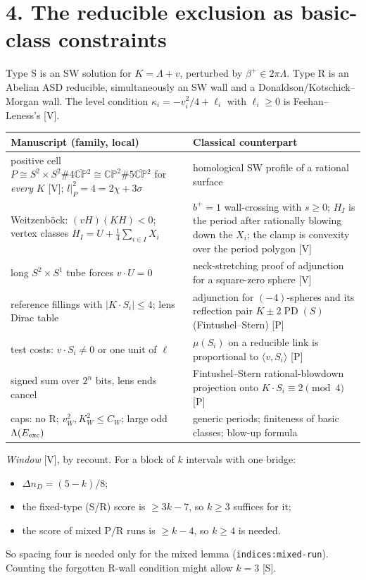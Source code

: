 \documentclass[10pt]{amsart}
\newcommand{\CP}{\mathbb{CP}}\newcommand{\CPb}{\overline{\mathbb{CP}}{}^2}
\newcommand{\PD}{\operatorname{PD}}\newcommand{\CS}{\operatorname{CS}}
\newcommand{\V}{\textsf{[V]}}\newcommand{\Pl}{\textsf{[P]}}\newcommand{\Sp}{\textsf{[S]}}
\begin{document}
\section*{4. The reducible exclusion as basic-class constraints}
Type S is an SW solution for $K=\Lambda+v$, perturbed by $\beta^+\in2\pi\Lambda$. Type R is an Abelian ASD reducible, simultaneously an SW wall and a Donaldson/Kotschick--Morgan wall. The level condition $\kappa_i=-v_i^2/4+\ell_i$ with $\ell_i\ge0$ is Feehan--Leness's \V.
\begin{center}\small
\begin{tabular}{@{}p{}p{}@{}}
\toprule
Manuscript (family, local) & Classical counterpart \\ \midrule
positive cell $P\cong S^2\times S^2\#4\CPb\cong\CP^2\#5\CPb$ for \emph{every} $K$ \V; $l|_P^2=4=2\chi+3\sigma$ & homological SW profile of a rational surface \\
Weitzenb\"ock: $(vH)(KH)<0$; vertex classes $H_I=U+\tfrac14\sum_{i\in I}X_i$ & $b^+=1$ wall-crossing with $s\ge0$; $H_I$ is the period after rationally blowing down the $X_i$; the clamp is convexity over the period polygon \V \\
long $S^2\times S^1$ tube forces $v\cdot U=0$ & neck-stretching proof of adjunction for a square-zero sphere \V \\
reference fillings with $|K\cdot S_i|\le4$; lens Dirac table & adjunction for $(-4)$-spheres and its reflection pair $K\pm2\PD(S)$ (Fintushel--Stern) \Pl \\
test costs: $v\cdot S_i\ne0$ or one unit of $\ell$ & $\mu(S_i)$ on a reducible link is proportional to $\langle v,S_i\rangle$ \Pl \\
signed sum over $2^n$ bits, lens ends cancel & Fintushel--Stern rational-blowdown projection onto $K\cdot S_i\equiv2\pmod 4$ \Pl \\
caps: no R; $v_W^2,K_W^2\le C_W$; large odd $\Lambda(E_{\rm exc})$ & generic periods; finiteness of basic classes; blow-up formula \\
\bottomrule
\end{tabular}
\end{center}
\emph{Window} \V, by recount. For a block of $k$ intervals with one bridge:
\begin{itemize}
\item $\Delta n_D=(5-k)/8$;
\item the fixed-type (S/R) score is $\ge3k-7$, so $k\ge3$ suffices for it;
\item the score of mixed P/R runs is $\ge k-4$, so $k\ge4$ is needed.
\end{itemize}
So spacing four is needed only for the mixed lemma (\texttt{indices:mixed-run}). Counting the forgotten R-wall condition might allow $k=3$ \Sp.
\end{document}
